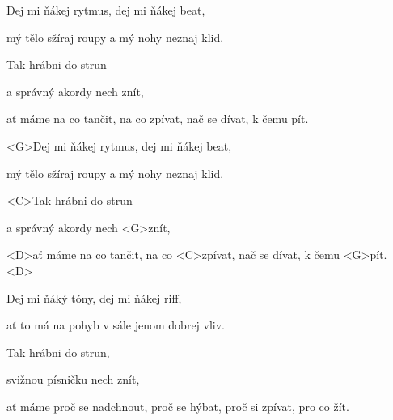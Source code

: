 

\ifdefined\TPBAND
\zs
Dej mi ňákej rytmus, dej mi ňákej beat,

mý tělo sžíraj roupy a mý nohy neznaj klid.

Tak hrábni do strun

a správný akordy nech znít,

ať máme na co tančit, na co zpívat, nač se dívat, k čemu pít.
\ks

\else
\zs
<G>Dej mi ňákej rytmus, dej mi ňákej beat,

mý tělo sžíraj roupy a mý nohy neznaj klid.

<C>Tak hrábni do strun

a správný akordy nech <G>znít,

<D>ať máme na co tančit, na co <C>zpívat, nač se dívat, k čemu <G>pít. <D>
\ks
\fi

\zs
Dej mi ňáký tóny, dej mi ňákej riff,

ať to má na pohyb v sále jenom dobrej vliv.

Tak hrábni do strun,

svižnou písničku nech znít,

ať máme proč se nadchnout, proč se hýbat, proč si zpívat, pro co žít.
\ks

\kp

